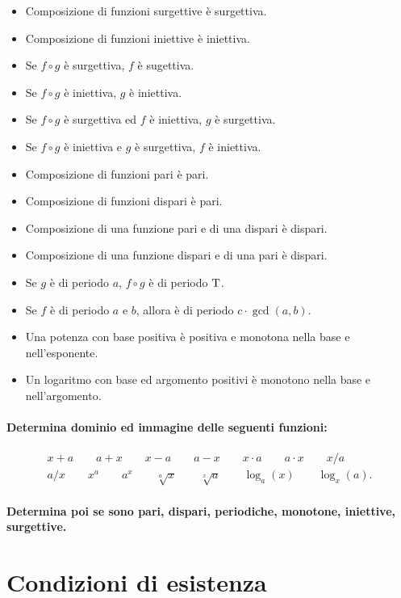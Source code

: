 \documentclass{article}
\begin{document}
\begin{itemize}
\item Composizione di funzioni surgettive è surgettiva.
\item Composizione di funzioni iniettive è iniettiva.
\item Se $f \circ g$ è surgettiva, $f$ è sugettiva.
\item Se $f \circ g$ è iniettiva, $g$ è iniettiva.
\item Se $f \circ g$ è surgettiva ed $f$ è iniettiva, $g$ è surgettiva.
\item Se $f \circ g$ è iniettiva e $g$ è surgettiva, $f$ è iniettiva.
\item Composizione di funzioni pari è pari.
\item Composizione di funzioni dispari è pari.
\item Composizione di una funzione pari e di una dispari è dispari.
\item Composizione di una funzione dispari e di una pari è dispari.
\item Se $g$ è di periodo $a$, $f \circ g$ è di periodo $\rm T$.
\item Se $f$ è di periodo $a$ e $b$, allora è di periodo $c \cdot \gcd(a, b)$.
\item Una potenza con base positiva è positiva e monotona nella base e nell'esponente.
\item Un logaritmo con base ed argomento positivi è monotono nella base e nell'argomento.
\end{itemize}

\paragraph{Determina dominio ed immagine delle seguenti funzioni:}

\begin{align*}
x + a \qquad a + x \qquad x - a \qquad a - x \qquad x \cdot a \qquad a \cdot x \qquad x / a\\
a / x \qquad x^a \qquad a^x \qquad \sqrt[a]{x} \qquad \sqrt[x]{a} \qquad \log_a(x) \qquad \log_x(a).
\end{align*}

\paragraph{Determina poi se sono pari, dispari, periodiche, monotone, iniettive, surgettive.}

\newpage
\section*{Condizioni di esistenza}
\end{document}
